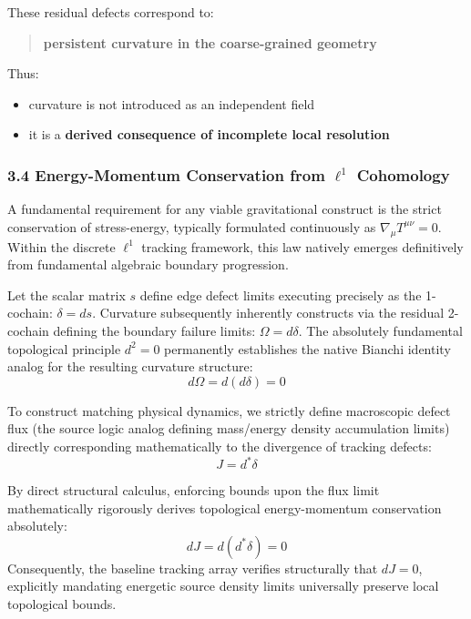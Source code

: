 \documentclass[
]{article}
\providecommand{\tightlist}{%
  \setlength{\itemsep}{0pt}\setlength{\parskip}{0pt}}
\begin{document}
These residual defects correspond to:

\begin{quote}
\textbf{persistent curvature in the coarse-grained geometry}
\end{quote}

Thus:

\begin{itemize}
\tightlist
\item
  curvature is not introduced as an independent field
\item
  it is a \textbf{derived consequence of incomplete local resolution}
\end{itemize}

\subsubsection{\texorpdfstring{3.4 Energy-Momentum Conservation from
\(\ell^1\)
Cohomology}{3.4 Energy-Momentum Conservation from \textbackslash ell\^{}1 Cohomology}}\label{energy-momentum-conservation-from-ell1-cohomology}

A fundamental requirement for any viable gravitational construct is the
strict conservation of stress-energy, typically formulated continuously
as \(\nabla_\mu T^{\mu\nu} = 0\). Within the discrete \(\ell^1\)
tracking framework, this law natively emerges definitively from
fundamental algebraic boundary progression.

Let the scalar matrix \(s\) define edge defect limits executing
precisely as the 1-cochain: \(\delta = ds\). Curvature subsequently
inherently constructs via the residual 2-cochain defining the boundary
failure limits: \(\Omega = d\delta\). The absolutely fundamental
topological principle \(d^2 = 0\) permanently establishes the native
Bianchi identity analog for the resulting curvature structure:
\[ d\Omega = d(d\delta) = 0 \]

To construct matching physical dynamics, we strictly define macroscopic
defect flux (the source logic analog defining mass/energy density
accumulation limits) directly corresponding mathematically to the
divergence of tracking defects: \[ J = d^*\delta \]

By direct structural calculus, enforcing bounds upon the flux limit
mathematically rigorously derives topological energy-momentum
conservation absolutely: \[ dJ = d(d^*\delta) = 0 \] Consequently, the
baseline tracking array verifies structurally that \(dJ = 0\),
explicitly mandating energetic source density limits universally
preserve local topological bounds.
\end{document}
